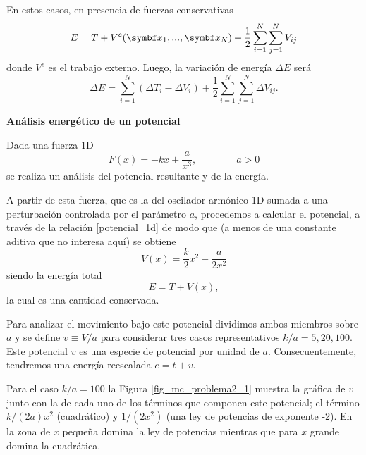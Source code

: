 \documentclass[10pt,oneside]{CBFT_book}
\begin{document}
En estos casos, en presencia de fuerzas conservativas
\[
	E = T + V^e(\vb{x}_1,...,\vb{x}_N) + \frac 1 2 \sum_{i=1}^N \sum_{j=1}^N V_{ij}
\]
donde $V^e$ es el trabajo externo. Luego, la variación de energía $\Delta E$ será
\[
	\Delta E = \sum_{i=1}^N ( \Delta T_i - \Delta V_i ) + \frac{1}{2} \sum_{i=1}^N \sum_{j=1}^N \Delta V_{ij}.
\]


\begin{ejemplo}{\bfseries Análisis energético de un potencial }

\label{ejemplo_analisis_potencial}
Dada una fuerza 1D 
\[
	F(x) = -k x + \frac{a}{x^3} ,	\qquad \qquad a > 0
\]
se realiza un análisis del potencial resultante y de la energía.


\vspace*{1mm}
A partir de esta fuerza, que es la del oscilador armónico 1D sumada a una perturbación controlada por el parámetro 
$a$, procedemos a calcular el potencial, a través de la relación \eqref{potencial_1d} de modo que (a menos de una 
constante aditiva que no interesa aquí) se obtiene
\[
	V(x) = \frac{k}{2} x^2 + \frac{a}{2 x^2}
\]
siendo la energía total 
\[
	E = T + V( x ), 
\]
la cual es una cantidad conservada.

Para analizar el movimiento bajo este potencial dividimos ambos miembros sobre $ a $ y se define $ v \equiv V/a$ para 
considerar tres casos representativos $ k / a = 5, 20, 100 $. Este potencial $ v $ es una especie de potencial por 
unidad de $ a $. Consecuentemente, tendremos una energía reescalada $ e = t + v $.

Para el caso $ k / a = 100 $ la Figura \ref{fig_mc_problema2_1} muestra la gráfica de $ v $ junto con la de cada 
uno de los términos que componen este potencial; el término $k/(2a) x^2$ (cuadrático) y $1/(2x^2)$ (una ley de potencias 
de exponente -2). En la zona de $ x $ pequeña domina la ley de potencias mientras que para $ x $ grande domina la 
cuadrática. 


\end{ejemplo}
\end{document}
